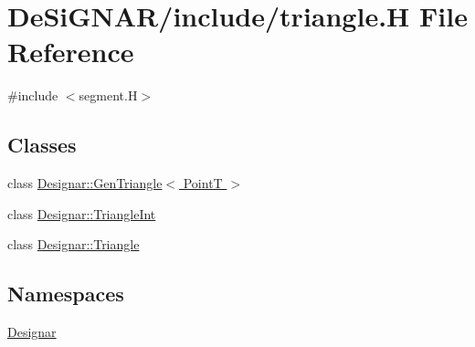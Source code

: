 \hypertarget{triangle_8_h}{}\section{De\+Si\+G\+N\+A\+R/include/triangle.H File Reference}
\label{triangle_8_h}
{\ttfamily \#include $<$segment.\+H$>$}\newline
\subsection*{Classes}
\begin{DoxyCompactItemize}
\item 
class \hyperlink{class_designar_1_1_gen_triangle}{Designar\+::\+Gen\+Triangle$<$ Point\+T $>$}
\item 
class \hyperlink{class_designar_1_1_triangle_int}{Designar\+::\+Triangle\+Int}
\item 
class \hyperlink{class_designar_1_1_triangle}{Designar\+::\+Triangle}
\end{DoxyCompactItemize}
\subsection*{Namespaces}
\begin{DoxyCompactItemize}
\item 
 \hyperlink{namespace_designar}{Designar}
\end{DoxyCompactItemize}
